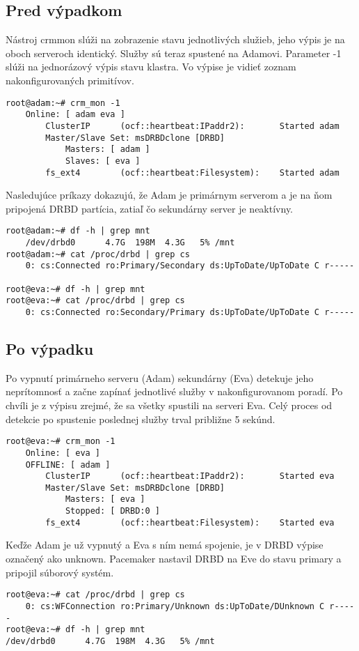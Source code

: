 \subsection{Pred výpadkom}
Nástroj crm\textunderscore mon slúži na zobrazenie stavu jednotlivých služieb, jeho výpis je na oboch serveroch identický. Služby sú teraz spustené na Adamovi. Parameter -1 slúži na jednorázový výpis stavu klastra. Vo výpise je vidieť zoznam nakonfigurovaných primitívov.
\begin{lstlisting}[label=lst:done-crm-before]
root@adam:~# crm_mon -1
	Online: [ adam eva ]
		ClusterIP      (ocf::heartbeat:IPaddr2):       Started adam
		Master/Slave Set: msDRBDclone [DRBD]
			Masters: [ adam ]
			Slaves: [ eva ]
		fs_ext4        (ocf::heartbeat:Filesystem):    Started adam
\end{lstlisting}

Nasledujúce príkazy dokazujú, že Adam je primárnym serverom a je na ňom pripojená DRBD partícia, zatiaľ čo sekundárny server je neaktívny.
\begin{lstlisting}
root@adam:~# df -h | grep mnt
	/dev/drbd0      4.7G  198M  4.3G   5% /mnt
root@adam:~# cat /proc/drbd | grep cs
	0: cs:Connected ro:Primary/Secondary ds:UpToDate/UpToDate C r-----

root@eva:~# df -h | grep mnt
root@eva:~# cat /proc/drbd | grep cs
	0: cs:Connected ro:Secondary/Primary ds:UpToDate/UpToDate C r-----
\end{lstlisting}

\subsection{Po výpadku}
Po vypnutí primárneho serveru (Adam) sekundárny (Eva) detekuje jeho neprítomnosť a začne zapínať jednotlivé služby v nakonfigurovanom poradí. Po chvíli je z výpisu zrejmé, že sa všetky spustili na serveri Eva. Celý proces od detekcie po spustenie poslednej služby trval približne 5 sekúnd.
\begin{lstlisting}[label=lst:done-crm-after]
root@eva:~# crm_mon -1
	Online: [ eva ]
	OFFLINE: [ adam ]
		ClusterIP      (ocf::heartbeat:IPaddr2):       Started eva
		Master/Slave Set: msDRBDclone [DRBD]
			Masters: [ eva ]
			Stopped: [ DRBD:0 ]
		fs_ext4        (ocf::heartbeat:Filesystem):    Started eva
\end{lstlisting}

Keďže Adam je už vypnutý a Eva s ním nemá spojenie, je v DRBD výpise označený ako unknown. Pacemaker nastavil DRBD na Eve do stavu primary a pripojil súborový systém.
\begin{lstlisting}
root@eva:~# cat /proc/drbd | grep cs
	0: cs:WFConnection ro:Primary/Unknown ds:UpToDate/DUnknown C r-----
root@eva:~# df -h | grep mnt
/dev/drbd0      4.7G  198M  4.3G   5% /mnt
\end{lstlisting}

